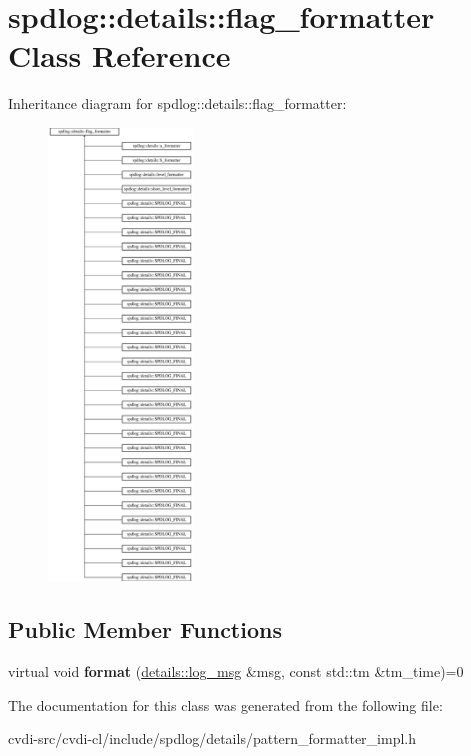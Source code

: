 \hypertarget{classspdlog_1_1details_1_1flag__formatter}{}\section{spdlog\+:\+:details\+:\+:flag\+\_\+formatter Class Reference}
\label{classspdlog_1_1details_1_1flag__formatter}
Inheritance diagram for spdlog\+:\+:details\+:\+:flag\+\_\+formatter\+:\begin{figure}[H]
\begin{center}
\leavevmode
\includegraphics[height=12.000000cm]{classspdlog_1_1details_1_1flag__formatter}
\end{center}
\end{figure}
\subsection*{Public Member Functions}
\begin{DoxyCompactItemize}
\item 
virtual void {\bfseries format} (\hyperlink{structspdlog_1_1details_1_1log__msg}{details\+::log\+\_\+msg} \&msg, const std\+::tm \&tm\+\_\+time)=0\hypertarget{classspdlog_1_1details_1_1flag__formatter_a63655aca1ab3c595b80bfb79ffc37ef7}{}\label{classspdlog_1_1details_1_1flag__formatter_a63655aca1ab3c595b80bfb79ffc37ef7}

\end{DoxyCompactItemize}


The documentation for this class was generated from the following file\+:\begin{DoxyCompactItemize}
\item 
cvdi-\/src/cvdi-\/cl/include/spdlog/details/pattern\+\_\+formatter\+\_\+impl.\+h\end{DoxyCompactItemize}
